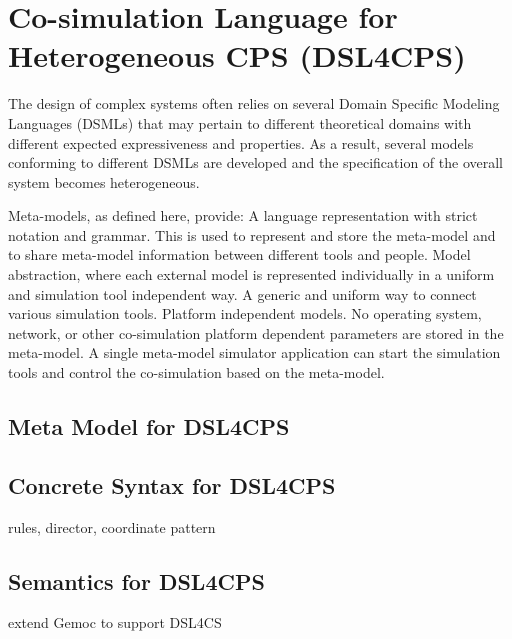 \section{Co-simulation Language for Heterogeneous CPS (DSL4CPS)}
The design of complex systems often relies on several Domain Specific Modeling Languages (DSMLs) that may pertain to different theoretical domains with different expected expressiveness and properties. As a result, several models conforming to different DSMLs are developed and the specification of the
overall system becomes heterogeneous.

Meta-models, as defined here, provide: A language representation with strict notation and grammar. This is used to represent and store the meta-model and to share meta-model information between different tools and people. 
Model abstraction, where each external model is represented individually in a uniform and simulation tool independent way. A generic and uniform way to connect various simulation tools. Platform independent models. No operating system, network, or other co-simulation platform dependent parameters are stored in the meta-model. A single meta-model simulator application can start the simulation tools and control the co-simulation based on the meta-model. 
\subsection{Meta Model for DSL4CPS}

\subsection{Concrete Syntax for DSL4CPS}
rules, director, coordinate pattern
\subsection{Semantics for DSL4CPS}
extend Gemoc to support DSL4CS